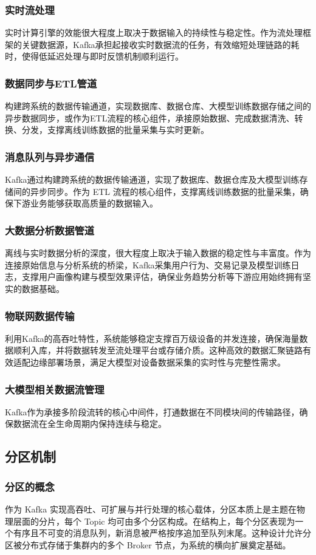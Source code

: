 		\subsubsection{实时流处理}
		实时计算引擎的效能很大程度上取决于数据输入的持续性与稳定性。作为流处理框架的关键数据源，Kafka承担起接收实时数据流的任务，有效缩短处理链路的耗时，使得低延迟处理与即时反馈机制顺利运行。
		\subsubsection{数据同步与ETL管道}
		构建跨系统的数据传输通道，实现数据库、数据仓库、大模型训练数据存储之间的异步数据同步，或作为ETL流程的核心组件，承接原始数据、完成数据清洗、转换、分发，支撑离线训练数据的批量采集与实时更新。
		\subsubsection{消息队列与异步通信}
		Kafka通过构建跨系统的数据传输通道，实现了数据库、数据仓库及大模型训练存储间的异步同步。作为 ETL 流程的核心组件，支撑离线训练数据的批量采集，确保下游业务能够获取高质量的数据输入。
		\subsubsection{大数据分析数据管道}
		离线与实时数据分析的深度，很大程度上取决于输入数据的稳定性与丰富度。作为连接原始信息与分析系统的桥梁，Kafka采集用户行为、交易记录及模型训练日志，支撑用户画像构建与模型效果评估，确保业务趋势分析等下游应用始终拥有坚实的数据基础\cite{t2019studymodernmessagingsystems}。
		\subsubsection{物联网数据传输}
		利用Kafka的高吞吐特性，系统能够稳定支撑百万级设备的并发连接，确保海量数据顺利入库，并将数据转发至流处理平台或存储介质。这种高效的数据汇聚链路有效适配边缘部署场景，满足大模型对设备数据采集的实时性与完整性需求。
		\subsubsection{大模型相关数据流管理}
		Kafka作为承接多阶段流转的核心中间件，打通数据在不同模块间的传输路径，确保数据流在全生命周期内保持连续与稳定。
		
	\subsection{分区机制}
		\subsubsection{分区的概念} 
		作为 Kafka 实现高吞吐、可扩展与并行处理的核心载体，分区本质上是主题在物理层面的分片，每个 Topic 均可由多个分区构成。在结构上，每个分区表现为一个有序且不可变的消息队列，新消息被严格按序追加至队列末尾。这种设计允许分区被分布式存储于集群内的多个 Broker 节点，为系统的横向扩展奠定基础。
